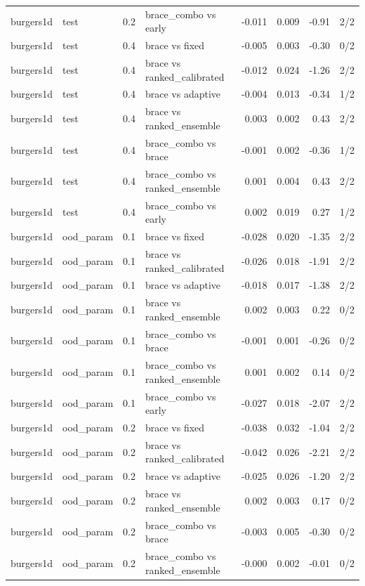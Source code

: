 \begin{tabular}{llllrrrr}
burgers1d & test & 0.2 & brace\_combo vs early & -0.011 & 0.009 & -0.91 & 2/2 \\
burgers1d & test & 0.4 & brace vs fixed & -0.005 & 0.003 & -0.30 & 0/2 \\
burgers1d & test & 0.4 & brace vs ranked\_calibrated & -0.012 & 0.024 & -1.26 & 2/2 \\
burgers1d & test & 0.4 & brace vs adaptive & -0.004 & 0.013 & -0.34 & 1/2 \\
burgers1d & test & 0.4 & brace vs ranked\_ensemble & 0.003 & 0.002 & 0.43 & 2/2 \\
burgers1d & test & 0.4 & brace\_combo vs brace & -0.001 & 0.002 & -0.36 & 1/2 \\
burgers1d & test & 0.4 & brace\_combo vs ranked\_ensemble & 0.001 & 0.004 & 0.43 & 2/2 \\
burgers1d & test & 0.4 & brace\_combo vs early & 0.002 & 0.019 & 0.27 & 1/2 \\
burgers1d & ood\_param & 0.1 & brace vs fixed & -0.028 & 0.020 & -1.35 & 2/2 \\
burgers1d & ood\_param & 0.1 & brace vs ranked\_calibrated & -0.026 & 0.018 & -1.91 & 2/2 \\
burgers1d & ood\_param & 0.1 & brace vs adaptive & -0.018 & 0.017 & -1.38 & 2/2 \\
burgers1d & ood\_param & 0.1 & brace vs ranked\_ensemble & 0.002 & 0.003 & 0.22 & 0/2 \\
burgers1d & ood\_param & 0.1 & brace\_combo vs brace & -0.001 & 0.001 & -0.26 & 0/2 \\
burgers1d & ood\_param & 0.1 & brace\_combo vs ranked\_ensemble & 0.001 & 0.002 & 0.14 & 0/2 \\
burgers1d & ood\_param & 0.1 & brace\_combo vs early & -0.027 & 0.018 & -2.07 & 2/2 \\
burgers1d & ood\_param & 0.2 & brace vs fixed & -0.038 & 0.032 & -1.04 & 2/2 \\
burgers1d & ood\_param & 0.2 & brace vs ranked\_calibrated & -0.042 & 0.026 & -2.21 & 2/2 \\
burgers1d & ood\_param & 0.2 & brace vs adaptive & -0.025 & 0.026 & -1.20 & 2/2 \\
burgers1d & ood\_param & 0.2 & brace vs ranked\_ensemble & 0.002 & 0.003 & 0.17 & 0/2 \\
burgers1d & ood\_param & 0.2 & brace\_combo vs brace & -0.003 & 0.005 & -0.30 & 0/2 \\
burgers1d & ood\_param & 0.2 & brace\_combo vs ranked\_ensemble & -0.000 & 0.002 & -0.01 & 0/2 \\

\end{tabular}
